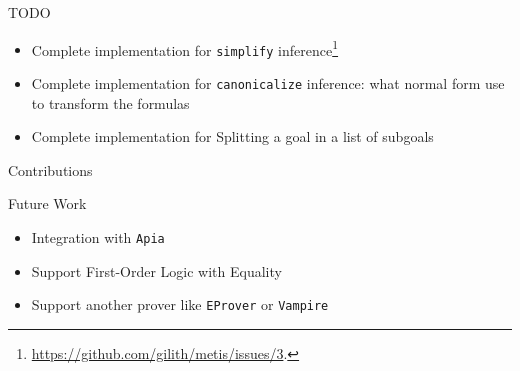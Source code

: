 \documentclass[10pt, xetex, hyperref={pdfpagelabels=false}]{beamer}
\begin{document}
\begin{frame}[label=pending-work]{TODO}
\begin{itemize}
\item Complete implementation for \texttt{simplify} inference\footnote{\url{https://github.com/gilith/metis/issues/3}.}
\item Complete implementation for \texttt{canonicalize} inference: what
normal form use to transform the formulas
\item Complete implementation for Splitting a goal in a list of subgoals
\end{itemize}
\end{frame}

\begin{frame}[label=contributions]{Contributions}
\vfill
\begin{table}[!ht]
\begin{center}
\end{center}
\end{table}
\vfill
\end{frame}

\begin{frame}[label=future-work]{Future Work}
\begin{itemize}
  \item Integration with \texttt{Apia}
  \item Support First-Order Logic with Equality
  \item Support another prover like \texttt{EProver} or \texttt{Vampire}
\end{itemize}
\end{frame}
\end{document}
